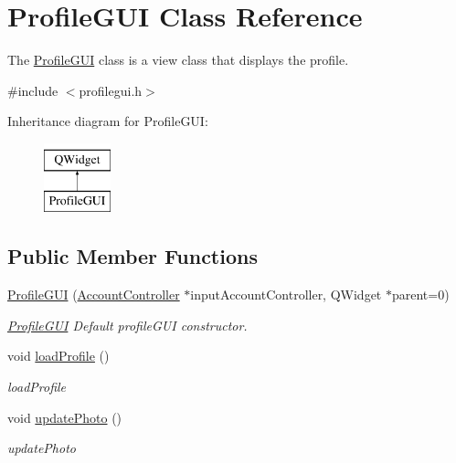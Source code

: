 \hypertarget{classProfileGUI}{}\section{Profile\+G\+UI Class Reference}
\label{classProfileGUI}


The \hyperlink{classProfileGUI}{Profile\+G\+UI} class is a view class that displays the profile.  




{\ttfamily \#include $<$profilegui.\+h$>$}

Inheritance diagram for Profile\+G\+UI\+:\begin{figure}[H]
\begin{center}
\leavevmode
\includegraphics[height=2.000000cm]{classProfileGUI}
\end{center}
\end{figure}
\subsection*{Public Member Functions}
\begin{DoxyCompactItemize}
\item 
\hyperlink{classProfileGUI_ae9649660708dd225fe1d6d1f7d058e35}{Profile\+G\+UI} (\hyperlink{classAccountController}{Account\+Controller} $\ast$input\+Account\+Controller, Q\+Widget $\ast$parent=0)
\begin{DoxyCompactList}\small\item\em \hyperlink{classProfileGUI}{Profile\+G\+UI} Default profile\+G\+UI constructor. \end{DoxyCompactList}\item 
void \hyperlink{classProfileGUI_a91d7fc34da35180f97a9a861e89a1c65}{load\+Profile} ()\hypertarget{classProfileGUI_a91d7fc34da35180f97a9a861e89a1c65}{}\label{classProfileGUI_a91d7fc34da35180f97a9a861e89a1c65}

\begin{DoxyCompactList}\small\item\em load\+Profile \end{DoxyCompactList}\item 
void \hyperlink{classProfileGUI_a66706acfc3cd770e695fb92a71750b77}{update\+Photo} ()\hypertarget{classProfileGUI_a66706acfc3cd770e695fb92a71750b77}{}\label{classProfileGUI_a66706acfc3cd770e695fb92a71750b77}

\begin{DoxyCompactList}\small\item\em update\+Photo \end{DoxyCompactList}\end{DoxyCompactItemize}



